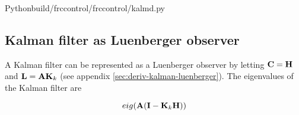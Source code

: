 \begin{code}{Python}{build/frccontrol/frccontrol/kalmd.py}
  \caption{Steady-state Kalman gain and error covariance matrices calculation in
    Python}
  \label{lst:kalman}
\end{code}

\subsection{Kalman filter as Luenberger observer}

A Kalman filter can be represented as a Luenberger observer by letting
$\mathbf{C} = \mathbf{H}$ and $\mathbf{L} = \mathbf{A} \mathbf{K}_k$ (see appendix
\ref{sec:deriv-kalman-luenberger}). The eigenvalues of the Kalman filter are

\begin{equation}
  eig(\mathbf{A}(\mathbf{I} - \mathbf{K}_k\mathbf{H}))
\end{equation}
